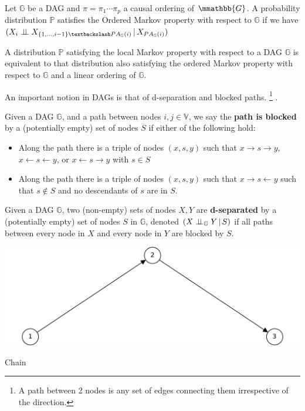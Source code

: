 \documentclass{tufte-book}
\begin{document}
\begin{Definition}
\begin{definition}\label{orderedmarkov}
Let $\mathbb{G}$ be a DAG and $\pi = \pi_1 \cdots \pi_p$ a causal ordering of $\mmathbb{G}$. A probability distribution $\mathbb{P}$ satisfies the Ordered Markov property with respect to $\mathbb{G}$ if we have $(X_i \indep X_{\{1,...,i-1 \} \textbackslash PA_{\mathbb{G}}(i)}\,|\, X_{PA_{\mathbb{G}}(i)})$ 
\end{definition}

A distribution \(\mathbb{P}\) satisfying the local Markov property with respect to a DAG \(\mathbb{G}\) is equivalent to that distribution also satisfying the ordered Markov property with respect to \(\mathbb{G}\) and a linear ordering of \(\mathbb{G}\).


An important notion in DAGs is that of d-separation and blocked paths.
  \footnote{\baselineskip \baselineskip A path between 2 nodes is any set of edges connecting them irrespective of the direction.} .


\begin{definition}\label{bpath}

Given a DAG $\mathbb{G}$, and a path between nodes $i,j \in \mathbb{V}$, we say the \textbf{path is blocked} by a (potentially empty) set of nodes $S$ if either of the following hold:
\begin{itemize}
\item Along the path there is a triple of nodes $(x,s,y)$ such that $x \rightarrow s \rightarrow y$, $x \leftarrow s \leftarrow y$, or $x \leftarrow s \rightarrow y$ with $s \in S$
\item Along the path there is a triple of nodes $(x,s,y)$ such that $x \rightarrow s \leftarrow y$ such that $s \notin S$ and no descendants of $s$ are in $S$.
\end{itemize}

\end{definition}


\begin{definition}[d-separation]\label{def:dsep}

Given a DAG $\mathbb{G}$,  two (non-empty) sets of nodes $X,Y$ are \textbf{d-separated} by a (potentially empty) set of nodes $S$ in $\mathbb{G}$, denoted $(X\perp \!\!\! \perp_{\mathbb{G}}Y\,|\,S)$ if all paths between every node in $X$ and every node in $Y$ are blocked by $S$. 

\end{definition}

 \begin{marginfigure} \includegraphics[width=\linewidth]{ ./figures/chainl.pdf}\caption{ Chain} \end{marginfigure} 


\end{Definition}
\end{document}
